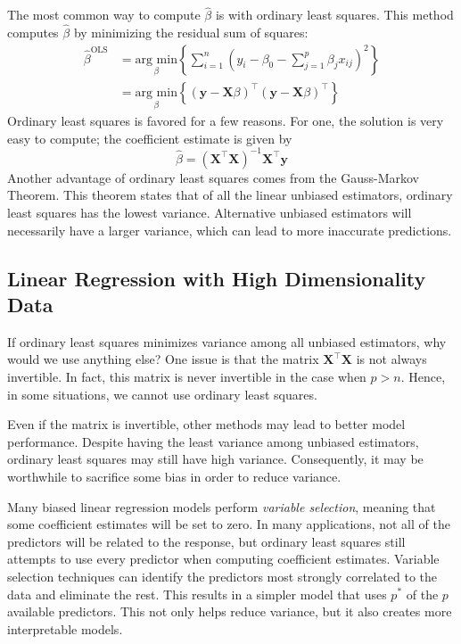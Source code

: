 \documentclass{article}
\newcommand{\argmin}[1]{\underset{\beta}{\text{arg min}}}
\begin{document}
The most common way to compute $\hat{\beta}$ is with ordinary least squares. This method computes $\hat{\beta}$ by minimizing the residual sum of squares:
\begin{align}
	\hat{\beta}^{\text{OLS}} &= \argmin{\beta}\left\{\sum_{i=1}^{n} \left( y_i - \beta_0 - \sum_{j=1}^{p} \beta_jx_{ij} \right)^2 \right\}\\
	&= \argmin{\beta} \left\{ (\mathbf{y} - \mathbf{X}\beta)^\top (\mathbf{y} - \mathbf{X}\beta)^\top\right\}
\end{align}
Ordinary least squares is favored for a few reasons. For one, the solution is very easy to compute; the coefficient estimate is given by
\begin{equation}
	\hat{\beta} = (\mathbf{X}^\top\mathbf{X})^{-1}\mathbf{X}^\top\mathbf{y}
\end{equation}
Another advantage of ordinary least squares comes from the Gauss-Markov Theorem. This theorem states that of all the linear unbiased estimators, ordinary least squares has the lowest variance. Alternative unbiased estimators will necessarily have a larger variance, which can lead to more inaccurate predictions.

\subsection{Linear Regression with High Dimensionality Data}

If ordinary least squares minimizes variance among all unbiased estimators, why would we use anything else? One issue is that the matrix $\mathbf{X}^\top\mathbf{X}$ is not always invertible. In fact, this matrix is never invertible in the case when $p>n$. Hence, in some situations, we cannot use ordinary least squares.

Even if the matrix is invertible, other methods may lead to better model performance. Despite having the least variance among unbiased estimators, ordinary least squares may still have high variance. Consequently, it may be worthwhile to sacrifice some bias in order to reduce variance.

Many biased linear regression models perform \textit{variable selection}, meaning that some coefficient estimates will be set to zero. In many applications, not all of the predictors will be related to the response, but ordinary least squares still attempts to use every predictor when computing coefficient estimates. Variable selection techniques can identify the predictors most strongly correlated to the data and eliminate the rest. This results in a simpler model that uses $p^\ast$ of the $p$ available predictors. This not only helps reduce variance, but it also creates more interpretable models.
\end{document}
